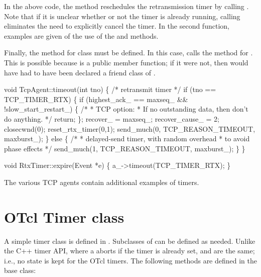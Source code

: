 In the above code, the  method reschedules the 
retransmission timer by calling .  Note that if
it is unclear whether or not the timer is already running, calling
 eliminates the need to explicitly cancel the timer.  In
the second function, examples are given of the use of the 
and  methods.

Finally, the  method for class  must be 
defined.  In this case,  calls the  method
for .  This is possible because  is a 
public member function; if it were not, then  would have
had to have been declared a friend class of .
\begin{program}
void TcpAgent::timeout(int tno)
\{                     
    /* retransmit timer */
    if (tno == TCP_TIMER_RTX) \{
        if (highest_ack_ == maxseq_ && !slow_start_restart_) \{
            /*
             * {\cf TCP option:}
             * {\cf If no outstanding data, then don't do anything.}
             */
            return;  
        \};
        recover_ = maxseq_;
        recover_cause_ = 2;
        closecwnd(0);
        reset_rtx_timer(0,1);
        send_much(0, TCP_REASON_TIMEOUT, maxburst_); 
    \} else \{
        /* 
         * {\cf delayed-send timer, with random overhead}
         * {\cf to avoid phase effects  }
         */     
        send_much(1, TCP_REASON_TIMEOUT, maxburst_);
    \}           
\}           
            
void RtxTimer::expire(Event *e) \{
    a_->timeout(TCP_TIMER_RTX);
\}
\end{program}

The various TCP agents contain additional examples of timers.

\section{OTcl Timer class}
\label{sec:otcltimer}

A simple timer class is defined in .  Subclasses of
 can be defined as needed.  Unlike the C++ timer API, where a 
 aborts if the timer is already set,  and
 are the same; i.e., no state is kept for the OTcl timers.
The following methods are defined in the  base class:

